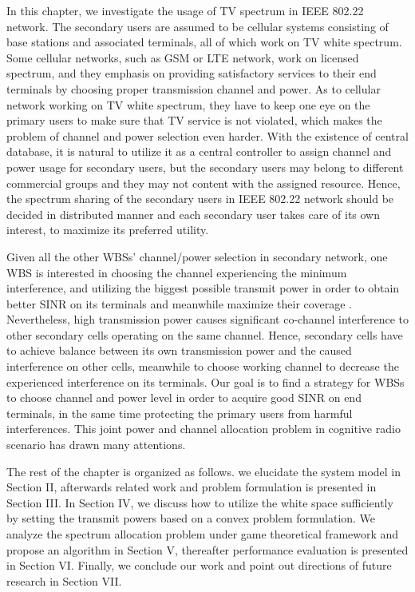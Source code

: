 In this chapter, we investigate the usage of TV spectrum in IEEE 802.22 network.
The secondary users are assumed to be cellular systems consisting of base stations and associated terminals, all of which work on TV white spectrum. 
Some cellular networks, such as GSM or LTE network, work on licensed spectrum, and they emphasis on providing satisfactory services to their end terminals by choosing proper transmission channel and power. 
As to cellular network working on TV white spectrum, they have to keep one eye on the primary users to make sure that TV service is not violated, which makes the problem of channel and power selection even harder.
With the existence of central database, it is natural to utilize it as a central controller to assign channel and power usage for secondary users, but the secondary users may belong to different commercial groups and they may not content with the assigned resource.
Hence, the spectrum sharing of the secondary users in IEEE 802.22 network should be decided in distributed manner and each secondary user takes care of its own interest, \ie to maximize its preferred utility.

Given all the other WBSs' channel/power selection in secondary network, one WBS is interested in choosing the channel experiencing the minimum interference, and utilizing the biggest possible transmit power in order to obtain better SINR on its terminals and meanwhile maximize their coverage \cite{wuinfocom09, HoangPowerChannel2010}. 
Nevertheless, high transmission power causes significant co-channel interference to other secondary cells operating on the same channel. 
Hence, secondary cells have to achieve balance between its own transmission power and the caused interference on other cells, meanwhile to choose working channel to decrease the experienced interference on its terminals. 
Our goal is to find a strategy for WBSs to choose channel and power level in order to acquire good SINR on end terminals, in the same time protecting the primary users from harmful interferences.
This joint power and channel allocation problem in cognitive radio scenario has drawn many attentions.

The rest of the chapter is organized as follows. we elucidate the system model in Section II, afterwards related work and problem formulation is presented in Section III. In Section IV, we discuss how to utilize the white space sufficiently by setting the transmit powers based on a convex problem formulation. We analyze the spectrum allocation problem under game theoretical framework and propose an algorithm in Section V, thereafter performance evaluation is presented in Section VI. Finally, we conclude our work and point out directions of future research in Section VII.


